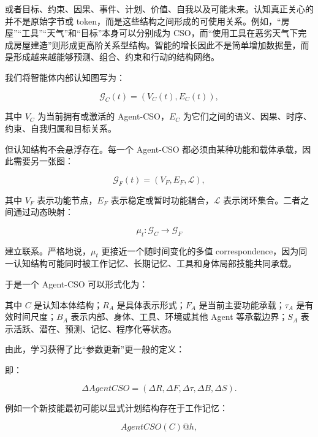 或者目标、约束、因果、事件、计划、价值、自我以及可能未来。认知真正关心的并不是原始字节或 token，而是这些结构之间形成的可使用关系。例如，“房屋”“工具”“天气”和“目标”本身可以分别成为 CSO，而“使用工具在恶劣天气下完成房屋建造”则形成更高阶关系型结构。智能的增长因此不是简单增加数据量，而是形成越来越能够预测、组合、约束和行动的结构网络。

我们将智能体内部认知图写为：

\[
\mathcal G_C(t)
=
\left(
V_C(t),E_C(t)
\right),
\]

其中 \(V_C\) 为当前拥有或激活的 Agent-CSO，\(E_C\) 为它们之间的语义、因果、时序、约束、自我归属和目标关系。

但认知结构不会悬浮存在。每一个 Agent-CSO 都必须由某种功能和载体承载，因此需要另一张图：

\[
\mathcal G_F(t)
=
\left(
V_F,E_F,\mathcal L
\right),
\]

其中 \(V_F\) 表示功能节点，\(E_F\) 表示稳定或暂时功能耦合，\(\mathcal L\) 表示闭环集合。二者之间通过动态映射：

\[
\mu_t:
\mathcal G_C
\rightarrow
\mathcal G_F
\]

建立联系。严格地说，\(\mu_t\) 更接近一个随时间变化的多值 correspondence，因为同一认知结构可能同时被工作记忆、长期记忆、工具和身体局部技能共同承载。

于是一个 Agent-CSO 可以形式化为：

\begin{statementbox}
\centering
{}
\end{statementbox}

其中 \(C\) 是认知本体结构；\(R_A\) 是具体表示形式；\(F_A\) 是当前主要功能承载；\(\tau_A\) 是有效时间尺度；\(B_A\) 表示内部、身体、工具、环境或其他 Agent 等承载边界；\(S_A\) 表示活跃、潜在、预测、记忆、程序化等状态。

由此，学习获得了比“参数更新”更一般的定义：

\begin{statementbox}
\centering
{}
\end{statementbox}

即：

\[
\Delta AgentCSO
=
(\Delta R,\Delta F,\Delta\tau,\Delta B,\Delta S).
\]

例如一个新技能最初可能以显式计划结构存在于工作记忆：

\[
AgentCSO(C)
@
h,
\]

